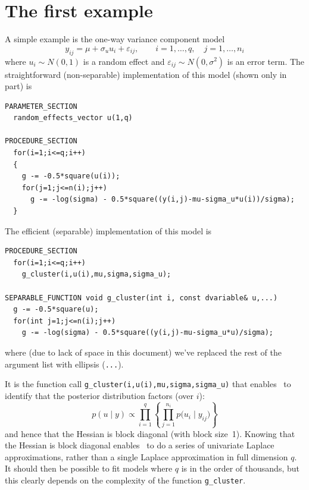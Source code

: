 \documentclass{admbmanual}
\begin{document}
\section{The first example}

A simple example is the one-way variance component model
\[
y_{ij}=\mu +\sigma_u u_i+\varepsilon_{ij},
\qquad i=1,\ldots,q,\quad j=1,\ldots,n_i
\]
where $u_i\sim N(0,1)$ is a random effect and $\varepsilon_{ij}\sim
N(0,\sigma^2)$ is an error term. The straightforward (non-separable)
implementation of this model (shown only in part) is
\begin{lstlisting}
PARAMETER_SECTION
  random_effects_vector u(1,q)

PROCEDURE_SECTION
  for(i=1;i<=q;i++)
  {
    g -= -0.5*square(u(i));
    for(j=1;j<=n(i);j++)
      g -= -log(sigma) - 0.5*square((y(i,j)-mu-sigma_u*u(i))/sigma);
  }
\end{lstlisting}
The efficient (separable) implementation of this model is
\begin{lstlisting}
PROCEDURE_SECTION
  for(i=1;i<=q;i++)
    g_cluster(i,u(i),mu,sigma,sigma_u);

SEPARABLE_FUNCTION void g_cluster(int i, const dvariable& u,...)
  g -= -0.5*square(u);
  for(int j=1;j<=n(i);j++)
    g -= -log(sigma) - 0.5*square((y(i,j)-mu-sigma_u*u)/sigma);
\end{lstlisting}
where (due to lack of space in this document) we've replaced the rest of the
argument list with ellipsis (\texttt{...}).

It is the function call \texttt{g\_cluster(i,u(i),mu,sigma,sigma\_u)} that
enables \scAR\ to identify that the posterior distribution
factors (over $i$):
\[
p(u \mid y) \propto \prod_{i=1}^q
\left\{\prod_{j=1}^{n_i}p \bigl(u_i \mid y_{ij}\bigr)\right\}
\]
and hence that the Hessian is block diagonal (with block size~1). Knowing that
the Hessian is block diagonal enables \scAR\ to do a series of univariate
Laplace approximations, rather than a single Laplace approximation in full
dimension $q$. It should then be possible to fit models where $q$ is in the
order of thousands, but this clearly depends on the complexity of the function
\texttt{g\_cluster}.
\end{document}
